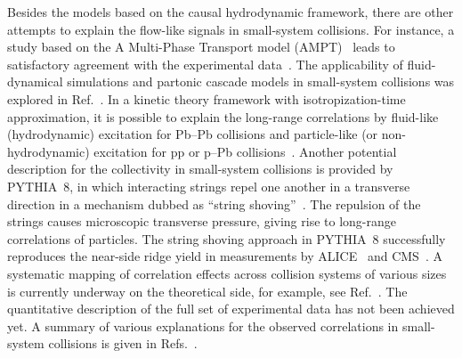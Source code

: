 Besides the models based on the causal hydrodynamic framework, there are other attempts to explain the flow-like signals in small-system collisions.  
For instance, a study based on the A Multi-Phase Transport model (AMPT)~\cite{Lin:2004en} leads to satisfactory agreement with the experimental data~\cite{OrjuelaKoop:2015jss}. The applicability of fluid-dynamical simulations and partonic cascade models in small-system collisions was explored in Ref.~\cite{Gallmeister:2018mcn}. In a kinetic theory framework with isotropization-time approximation, it is possible to explain the long-range correlations by fluid-like (hydrodynamic) excitation for Pb--Pb collisions and particle-like (or non-hydrodynamic) excitation for pp or p--Pb collisions~\cite{Kurkela:2019kip,Kurkela:2020wwb,Ambrus:2021fej}. Another potential description for the collectivity in small-system collisions is provided by PYTHIA~8, in which interacting strings repel one another in a transverse direction in a mechanism dubbed as ``string shoving''~\cite{Bierlich:2017vhg,Bierlich:2019ixq}. The repulsion of the strings causes microscopic transverse pressure, giving rise to long-range correlations of particles. The string shoving approach in PYTHIA~8 successfully reproduces the near-side ridge yield in measurements by ALICE~\cite{ALICE:2021nir} and CMS~\cite{Khachatryan:2016txc}. A systematic mapping of correlation effects across collision systems of various sizes is currently underway on the theoretical side, for example, see Ref.~\cite{Schenke:2020mbo}. The quantitative description of the full set of experimental data has not been achieved yet. A summary of various explanations for the observed correlations in small-system collisions is given in Refs.~\cite{Strickland:2018exs,Loizides:2016tew,Nagle:2018nvi}. 


